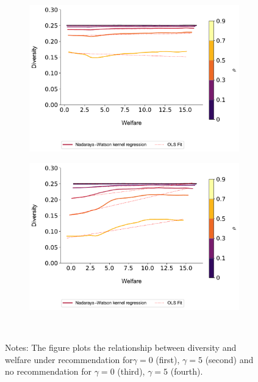 \documentclass[manuscript]{acmart}
\begin{document}
\begin{figure}[t]
\begin{minipage}{1.2\textwidth}
\begin{subfigure}{.23\textwidth}
\includegraphics[width=1.0\linewidth]{figures/diversity_welfare_rn_partial_n_200.pdf}
\end{subfigure}
\begin{subfigure}{.23\textwidth}
\includegraphics[width=1.0\linewidth]{figures/diversity_welfare_ra_partial_n_200.pdf}
\end{subfigure}
\end{minipage}\\
\caption*{\scriptsize Notes: The figure plots the relationship between diversity and welfare under recommendation for$\gamma = 0$ (first), $\gamma = 5$ (second) and no recommendation for $\gamma = 0$ (third), $\gamma = 5$ (fourth).}\label{fig:diversity_welfare_ra}
\end{figure}
\addtocounter{figure}{-1}
\end{document}
